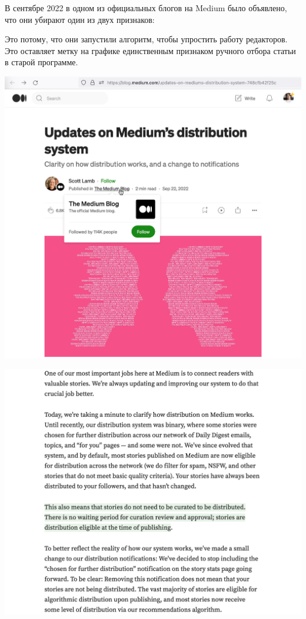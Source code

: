 В сентябре 2022 в одном из официальных блогов на Medium
было объявлено, что они убирают один из двух признаков:


Это потому, что они запустили алгоритм, чтобы упростить работу редакторов.
Это оставляет метку  на графике единственным признаком ручного отбора статьи в старой программе.

\begin{center}
    \includegraphics[width=38em]{no-more-p1}
\end{center}
\WillContinue
\pagebreak

\Continuing
\begin{center}
    \includegraphics[width=\textwidth]{no-more-p2}
\end{center}

\pagebreak
